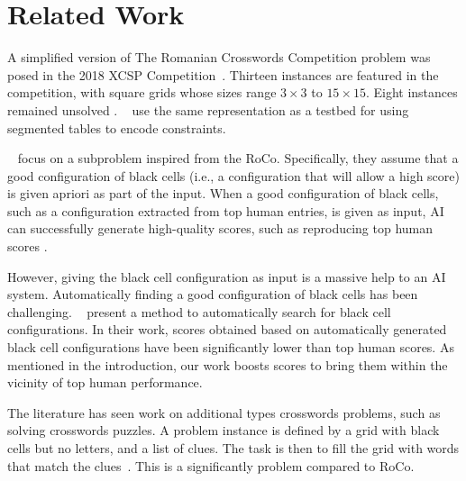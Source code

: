 \section{Related Work}
\label{sec::relwork}

A simplified version of The Romanian Crosswords Competition problem was posed
in the 2018 XCSP Competition~\cite{DBLP:journals/corr/abs-1901-01830}.
Thirteen instances are featured in the competition, 
with square grids whose sizes range $3 \times 3$ to $15 \times 15$.
Eight instances remained unsolved \cite{DBLP:journals/corr/abs-1901-01830}.
\citeauthor{DBLP:conf/ecai/AudemardLM20}~
use the same representation
as a testbed for using segmented tables
to encode constraints.

\citeauthor{DBLP:conf/socs/BoteaB21}~
focus on a subproblem inspired from the {\sc RoCo}.
Specifically, they assume that 
a good configuration of black cells 
(i.e., a configuration that will allow a high score)
is given apriori as part of the input.
When a good configuration of black cells,
such as a configuration extracted from top human entries,
is given as input, AI can successfully generate high-quality scores,
such as reproducing top human scores \cite{DBLP:conf/socs/BoteaB21}.

However, giving the black cell configuration as input is a massive help to an AI system.
Automatically finding a good configuration of black cells
has been challenging. 
\citeauthor{DBLP:conf/cig/BulitkoB21}~
present a method to automatically search for black cell configurations.
In their work, scores obtained based on automatically generated
black cell configurations have been significantly lower than 
top human scores.
As mentioned in the introduction, our work boosts scores
to bring them within the vicinity of top human performance.


The literature has seen work on additional types crosswords problems,
such as solving crosswords puzzles.
A problem instance is defined by a grid with black cells but no letters,
and a list of clues.
The task is then to fill the grid with words that match the 
clues~\cite{DBLP:journals/ai/LittmanKS02,DBLP:conf/aaai/ErnandesAG05,DBLP:journals/jair/Ginsberg11,Chen-icaps22}.
This is a significantly problem compared to {\sc RoCo}.


\begin{comment}
The problem of \emph{crosswords grid generation} takes as input
a list of words and
a grid with only black cells.
The task is to fill the grid with words from the
list~\cite{MAZLACK19761,10.5555/1865499.1865531,botea-modref07,anbulagan-botea-cp08}.
As mentioned in the introduction and in Section~\ref{sec::background}, {\sc Roco}
is a significant generalization of the standard crosswords grid generation.
\end{comment}